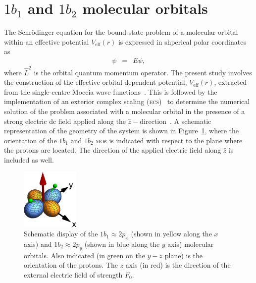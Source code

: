
\section{$1b_{1}$ and $1b_{2}$ molecular orbitals}
\label{ch:1b1_1b2}

The Schr\"{o}dinger equation for the bound-state problem of a
molecular orbital within an effective potential $V_{\mathrm{eff}}(r)$
is expressed in shperical polar coordinates as
%
\begin{eqnarray}
  [ -\frac{1}{2} \frac{d^2}{dr^2} + \frac{\hat{L}^2}{2r^2} + V_{\rm{eff}}(r)] \psi
  & = & E\psi,
\label{eq:sch_noCS}
\end{eqnarray}
%
where $\hat{L}^{2}$ is the orbital quantum momentum operator. The
present study involves the construction of the effective
orbital-dependent potential, $V_{\mathrm{eff}}(r)$, extracted from the
single-centre Moccia wave functions~\cite{Moccia_1964}. This is
followed by the implementation of an exterior complex scaling
(\textsc{ecs})~\cite{Simon_1979} to determine the numerical solution
of the problem associated with a molecular orbital in the presence of
a strong electric dc field applied along the
$\hat{z}-$direction~\cite{sarias_2016}. A schematic representation of
the geometry of the system is shown in Figure~\ref{fig:h2o_1b1_1b2},
where the orientation of the $1b_{1}$ and $1b_{2}$ \textsc{mo}s is
indicated with respect to the plane where the protons are located. The
direction of the applied electric field along $\hat{z}$ is included as
well.

\begin{figure}
  \centering
  \includegraphics[width=0.25\textwidth]{figures/ch_H2O/1b1_1b2/orbitals.eps}
  \caption{Schematic display of the $1b_{1}\approx 2p_{x}$ (shown in
    yellow along the $x$ axis) and $1b_{2}\approx 2p_{y}$ (shown in
    blue along the $y$ axis) molecular orbitals. Also indicated (in
    green on the $y-z$ plane) is the orientation of the protons. The
    $z$ axis (in red) is the direction of the external electric field
    of strength $F_{0}$.}
  \label{fig:h2o_1b1_1b2}
\end{figure}


